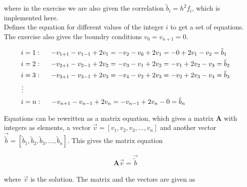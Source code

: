 \documentclass{article}
\begin{document}
  where in the exercise we are also given the correlation $\tilde{b}_i = h^2 f_i$, which is implemented here. \\

  Defines the equation for different values of the integer $i$ to get a set of equations. The exercise also gives the boundry conditions $v_0 = v_{n+1} = 0$.

  \begin{align*}
    i &= 1 : \hspace{5mm} - v_{1+1} - v_{1-1} + 2 v_1 = - v_2 - v_0 + 2 v_1 = - 0 + 2 v_1 - v_2 = \tilde{b}_1 \\
    i &= 2 : \hspace{5mm} - v_{2+1} - v_{2-1} + 2 v_2 = - v_3 - v_1 + 2 v_2 = - v_1 + 2 v_2 - v_3 = \tilde{b}_2 \\
    i &= 3 : \hspace{5mm} - v_{3+1} - v_{3-1} + 2 v_3 = - v_4 - v_2 + 2 v_3 = - v_2 + 2 v_3 - v_4 = \tilde{b}_3 \\
    \vdots \\
    i &= n : \hspace{5mm} - v_{n+1} - v_{n-1} + 2 v_n = - v_{n-1} + 2 v_n - 0 = \tilde{b}_n \\
  \end{align*}

  Equations can be rewritten as a matrix equation, which gives a matrix \textbf{A} with integers as elements, a vector $\vec{v} = [v_1, v_2, v_3, ... , v_n]$ and another vector $\vec{\tilde{b}} = [\tilde{b}_1, \tilde{b}_2, \tilde{b}_3, ... , \tilde{b}_n]$. This gives the matrix equation

  \begin{equation}
    \textbf{A} \vec{v} = \vec{\tilde{b}}  \label{eq:matrixeq}
  \end{equation} \\

  where $\vec{v}$ is the solution. The matrix and the vectors are given as
\end{document}
